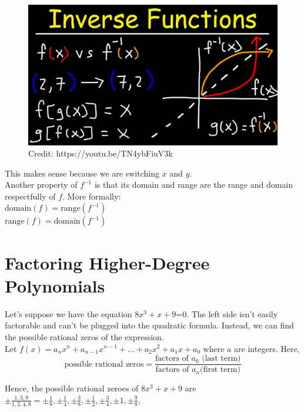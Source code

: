 \documentclass[12pt]{article}
\begin{document}
\begin{figure}[H]
	\centering
	\includegraphics[scale=0.2]{maxresdefault.jpg}
	\caption{Credit: https://youtu.be/TN4ybFiuV3k}
\end{figure}

This makes sense because we are switching \(x\) and \(y\).\\

Another property of \(f^{-1}\) is that its domain and range are the range and domain respectfully of \(f\). More formally:\\

\(\text{domain}(f)=\text{range}(f^{-1})\)\\

\(\text{range}(f)=\text{domain}(f^{-1})\)\\

\section{Factoring Higher-Degree Polynomials}

Let's suppose we have the equation \(8x^3+x+9\)=0. The left side isn't easily factorable and can't be plugged into the quadratic formula. Instead, we can find the possible rational zeros of the expression.\\

Let \(f(x)=a_nx^n+a_{n-1}x^{n-1}+...+a_2x^2+a_1x+a_0\) where  \(a\) are integers. Here,\\

\[\text{possible rational zeros}=\frac{\text{factors of }a_0\text{ (last term)}}{\text{factors of }a_n\text{(first term)}}\]

Hence, the possible rational zeroes of \(8x^3+x+9\) are \(\pm\frac{1,3,9}{1,2,4,8}=\pm\frac{1}{8},\pm\frac{1}{4}, \pm\frac{3}{8},\pm\frac{1}{2}, \pm\frac{3}{4},\pm1, \pm\frac{9}{8},\)
\end{document}
